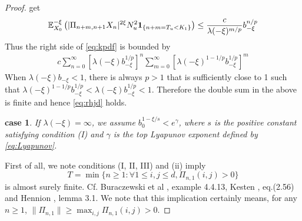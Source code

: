 \documentclass[aoas,preprint]{imsart}
\newtheorem{case}{case}
\numberwithin{equation}{section}
\theoremstyle{plain}
\begin{document}
\begin{proof}
  get
  \[
  \mathbb{E}_{X_0}^{-\xi} \left(
    | \Pi_{n+m,n+1} X_n |^{2 \xi}
    N_u^2
    \mathbf{1}_{\{n+m = T_u < K_1\}}
  \right) 
  \leq
  {
    c \over \lambda(-\xi)^{m/p}
  }
  b_{-\xi}^{n/p}
  \]
  Thus the right side of \eqref{eq:kpdf} is bounded by
  \begin{eqnarray*}
    c
    \sum_{n=0}^\infty
    \left[ \lambda(-\xi) b_{-\xi}^{1/p} \right]^{n}
    \sum_{m=0}^\infty
    \left[ \lambda(-\xi)^{1-1/p} b_{-\xi}^{1/p} \right]^{m}
  \end{eqnarray*}
  When $\lambda(-\xi) b_{-\xi} < 1$, there is always $p > 1$
  that is sufficiently close to 1 such that
  $\lambda(-\xi)^{1-1/p} b_{-\xi}^{1/p} < \lambda(-\xi)
  b_{-\xi}^{1/p} < 1$. Therefore the double sum in the above is
  finite and hence \eqref{eq:rhjd} holds.

  \begin{case}
    If $\lambda(-\xi) = \infty$, we assume
    $b_0^{1- \xi/s} < e^\gamma$, where $s$ is the positive constant
    satisfying condition (I) and $\gamma$ is the top Lyapunov exponent
    defined by \eqref{eq:Lyapunov}.
  \end{case}
  First of all, we note conditions (I, II, III) and (ii) imply
  \[
  T = \min\{n \geq 1: \forall 1 \leq i,j \leq d, \Pi_{n, 1}(i, j) > 0\}
  \]
  is almost surely finite. Cf.   Buraczewski et al
  \cite{buraczewski:damek:mikosch:2016}, example 4.4.13,
  Kesten \cite{kesten:1973}, eq.(2.56) and Hennion
  \cite{hennion:1997}, lemma 3.1. We note that this implication
  certainly means, for any $n \geq 1$,
  $\|\Pi_{n,1}\| \geq \max_{i,j} \Pi_{n,1}(i, j) > 0$.
  

\end{proof}
\end{document}
